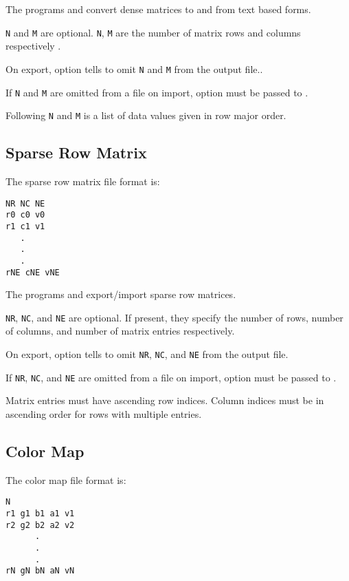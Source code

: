 The programs  and  
convert dense matrices to and from text based forms.

\verb|N| and \verb|M| are optional.  \verb|N|, \verb|M| are the number
of matrix rows and columns respectively .  

On export, option  tells
 to omit \verb|N| and \verb|M| from the
output file..

If \verb|N| and \verb|M| are omitted from a file on import, option
 must be passed to
.

Following \verb|N| and \verb|M| is a list of data values given in row
major order.


\subsection{Sparse Row Matrix}

The sparse row matrix file format is:

\begin{verbatim}
NR NC NE
r0 c0 v0
r1 c1 v1
   .
   .
   .
rNE cNE vNE
\end{verbatim}

The programs  and
 export/import sparse row matrices.

\verb|NR|, \verb|NC|, and \verb|NE| are optional.  If present, they
specify the number of rows, number of columns, and number of matrix
entries respectively.

On export, option  tells
 to omit \verb|NR|, \verb|NC|, and
\verb|NE| from the output file.

If \verb|NR|, \verb|NC|, and \verb|NE| are omitted from a file on
import, option  must be passed to .

Matrix entries must have ascending row indices. Column indices must be
in ascending order for rows with multiple entries.

\subsection{Color Map}
\label{sec:colormap_fmt}

The color map file format is:

\begin{verbatim}
N
r1 g1 b1 a1 v1
r2 g2 b2 a2 v2
      .
      .
      .
rN gN bN aN vN
\end{verbatim}

